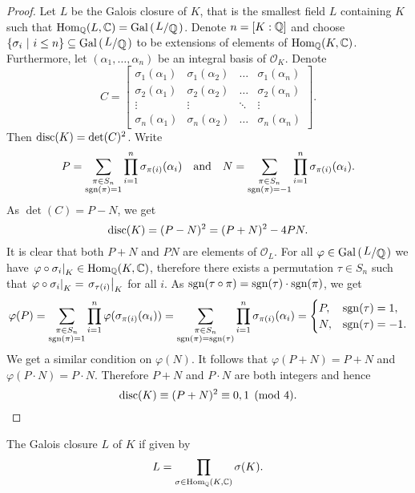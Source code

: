 \begin{proof}
Let $L$ be the Galois closure of $K$, that is the smallest field
$L$ containing $K$ such that
$\Hom_\Q(L, \C) = \Gal \br{\kvoc{L}{\Q}}$. Denote $n = [K : \mathbb{Q}]$
and choose
$\setb{\sigma_i}{i \leq n} \subseteq \Gal \br{\kvoc{L}{\Q}}$ to be
extensions of elements of $\operatorname{Hom}_{\mathbb{Q}}(K, \mathbb{C})$. Furthermore, let
$(\alpha_1, \dots, \alpha_n)$ be an integral basis of
$\mathcal{O}_K$. Denote
\[
C =
\begin{bmatrix}
\sigma_1(\alpha_1) & \sigma_1(\alpha_2) &
\dots & \sigma_1(\alpha_n) \\
\sigma_2(\alpha_1) & \sigma_2(\alpha_2) &
\dots & \sigma_2(\alpha_n) \\
\vdots & \vdots & \ddots & \vdots \\
\sigma_n(\alpha_1) & \sigma_n(\alpha_2) &
\dots & \sigma_n(\alpha_n)
\end{bmatrix}.
\]
Then $\operatorname{disc}(K) = \det(C)^2$. Write
\[
P =
\sum_{\substack{\pi \in S_n \\ \operatorname{sgn}(\pi) = 1}}
\prod_{i=1}^n \sigma_{\pi(i)}(\alpha_i)
\quad \text{and} \quad
N =
\sum_{\substack{\pi \in S_n \\ \operatorname{sgn}(\pi) = -1}}
\prod_{i=1}^n \sigma_{\pi(i)}(\alpha_i).
\]
As $\det(C) = P-N$, we get
\[
\operatorname{disc}(K) = (P-N)^2 = (P+N)^2 - 4 PN.
\]
It is clear that both $P+N$ and $PN$ are elements of
$\mathcal{O}_L$. For all $\varphi \in \Gal \br{\kvoc{L}{\Q}}$ we
have $\left. \varphi \circ \sigma_i\right|_{K}^{} \in \operatorname{Hom}_{\mathbb{Q}}(K, \mathbb{C})$,
therefore there exists a permutation $\tau \in S_n$ such that
$\left. \varphi \circ \sigma_i\right|_{K}^{} =
\left. \sigma_{\tau(i)}\right|_{K}^{}$ for all $i$. As
$\operatorname{sgn}(\tau \circ \pi) = \operatorname{sgn}(\tau) \cdot \operatorname{sgn}(\pi)$, we get
\[
\varphi(P) =
\sum_{\substack{\pi \in S_n \\ \operatorname{sgn}(\pi)=1}}
\prod_{i=1}^n \varphi(\sigma_{\pi(i)}(\alpha_i)) =
\sum_{\substack{\pi \in S_n \\ \operatorname{sgn}(\pi) = \operatorname{sgn}(\tau)}}
\prod_{i=1}^n \sigma_{\pi(i)}(\alpha_i) =
\begin{cases}
P, & \operatorname{sgn}(\tau) = 1,  \\
N, & \operatorname{sgn}(\tau) = -1.
\end{cases}
\]
We get a similar condition on $\varphi(N)$. It follows that
$\varphi(P+N) = P+N$ and $\varphi(P \cdot N) = P \cdot N$.
Therefore $P+N$ and $P \cdot N$ are both integers and hence
\[
\operatorname{disc}(K) \equiv (P+N)^2 \equiv 0, 1 \pmod{4}. \qedhere
\]
\end{proof}

\begin{opomba}
The Galois closure $L$ of $K$ if given by
\[
L = \prod_{\sigma \in \operatorname{Hom}_{\mathbb{Q}}(K, \mathbb{C})} \sigma(K).
\]
\end{opomba}
